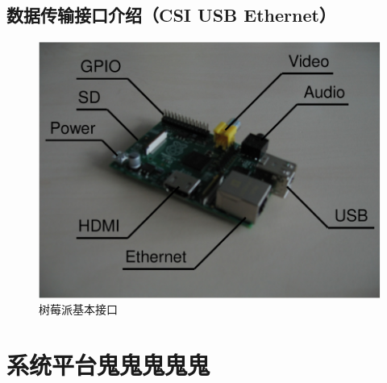 \subsection{数据传输接口介绍（CSI USB Ethernet）}

\begin{figure}[h]
	\centering
	\includegraphics[width=0.7\linewidth]{Figure/rasp_1}
	\caption{树莓派基本接口}
	\label{fig:rasp_1}
\end{figure}


\section{系统平台鬼鬼鬼鬼鬼}